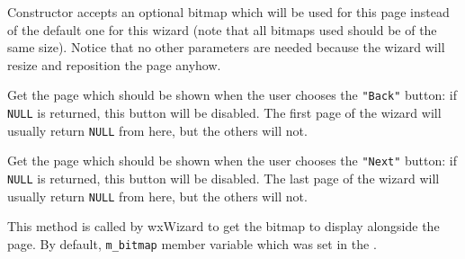 \label{wxwizardpagewxwizardpage}


Constructor accepts an optional bitmap which will be used for this page
instead of the default one for this wizard (note that all bitmaps used should
be of the same size). Notice that no other parameters are needed because the
wizard will resize and reposition the page anyhow.





\label{wxwizardpagegetprev}


Get the page which should be shown when the user chooses the {\tt "Back"}
button: if {\tt NULL} is returned, this button will be disabled. The first
page of the wizard will usually return {\tt NULL} from here, but the others
will not.



\label{wxwizardpagegetnext}


Get the page which should be shown when the user chooses the {\tt "Next"}
button: if {\tt NULL} is returned, this button will be disabled. The last
page of the wizard will usually return {\tt NULL} from here, but the others
will not.



\label{wxwizardpagegetbitmap}


This method is called by wxWizard to get the bitmap to display alongside the
page. By default, {\tt m\_bitmap} member variable which was set in the 
.

